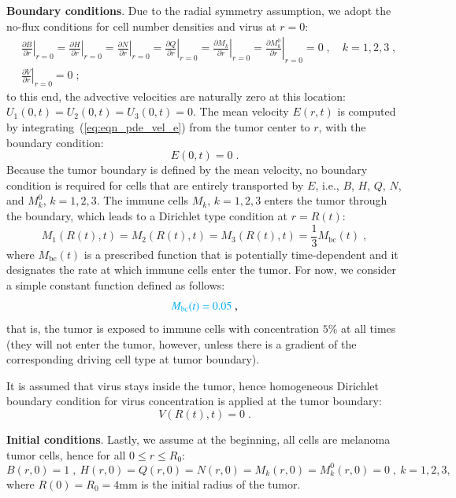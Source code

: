 \documentclass[reqno]{amsart}
\theoremstyle{definition}
\theoremstyle{remark}
\numberwithin{equation}{section}
\numberwithin{figure}{section}
\newcommand{\pp}[2]{\frac{\partial {#1}}{\partial {#2}}}
\begin{document}
{\bf Boundary conditions}. 
Due to the radial symmetry assumption, we adopt the no-flux conditions for cell number densities and virus at $r=0$:
\begin{align}
  \label{eq:eqn_pde_cbc}
  &\left.\pp{B}{r}\right|_{r=0} = 
  \left.\pp{H}{r}\right|_{r=0} = 
  \left.\pp{N}{r}\right|_{r=0} = 
  \left.\pp{Q}{r}\right|_{r=0} = 
  \left.\pp{M_k}{r}\right|_{r=0} = 
  \left.\pp{M_k^0}{r}\right|_{r=0} = 0\;,\quad k=1,2,3\;, \\
  \label{eq:eqn_pde_vbc}
  &\left.\pp{V}{r}\right|_{r=0} = 0\;;
\end{align}
to this end, the advective velocities are naturally zero at this location: $U_1(0,t)=U_2(0,t)=U_3(0,t)=0$.
The mean velocity $E(r,t)$ is computed by integrating~(\ref{eq:eqn_pde_vel_e}) from the tumor center to $r$, with the boundary condition:
\begin{equation}\label{eq:eqn_pde_ebc}
  E(0,t) = 0\;.
\end{equation}
Because the tumor boundary is defined by the mean velocity, no boundary condition is required for cells that are entirely transported by $E$, i.e., $B$, $H$, $Q$, $N$, and $M_k^0$, $k=1,2,3$.
The immune cells $M_k$, $k=1,2,3$ enters the tumor through the boundary, which leads to a Dirichlet type condition at $r=R(t)$:
\begin{equation}\label{eq:eqn_pde_rbc}
  M_1(R(t),t) = M_2(R(t),t) = M_3(R(t),t) = \frac{1}{3}M_{\textrm{bc}}(t)\;,
\end{equation}
where $M_{\textrm{bc}}(t)$ is a prescribed function that is potentially time-dependent and it designates the rate at which immune cells enter the tumor.
For now, we consider a simple constant function defined as follows:
\begin{equation}\label{eq:eqn_pde_tcell_bcval}
  {\color{cyan}M_{\textrm{bc}}(t) = 0.05}\;,
\end{equation}
that is, the tumor is exposed to immune cells with concentration $5\%$ at all times (they will not enter the tumor, however, unless there is a gradient of the corresponding driving cell type at tumor boundary).

It is assumed that virus stays inside the tumor, hence homogeneous Dirichlet boundary condition for virus concentration is applied at the tumor boundary:
\begin{equation}\label{eq:eqn_pde_virus_dbc}
  V(R(t),t) = 0\;.
\end{equation}

{\bf Initial conditions}.
Lastly, we assume at the beginning, all cells are melanoma tumor cells, hence for all $0\le r\le R_0$:
\begin{equation}\label{eq:eqn_pde_cell_ic}
  B(r,0) = 1\;,\ 
  H(r,0) = Q(r,0) = N(r,0) = M_k(r,0) = M_k^0(r,0) = 0\;,\ 
  k = 1,2,3,
\end{equation}
where {\color{cyan}$R(0) = R_0 = 4\textrm{mm}$} is the initial radius of the tumor.
\end{document}
